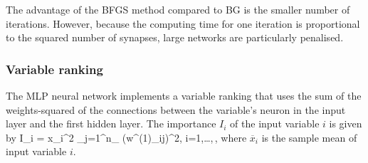 The advantage of the BFGS method compared to BG is the smaller number of
iterations. However, because the computing time for one iteration is
proportional to the squared number of synapses, large networks are
particularly penalised.

\subsubsection{Variable ranking}
\label{sec:ann:ranking}

The MLP neural network implements a variable ranking that uses the sum of the
weights-squared of the connections between the variable's neuron in the input
layer and the first hidden layer. The importance $I_i$ of the input variable
$i$ is given by
\beq
  \label{eq:mlp:ranking}
  I_i = \overline x_i^2 \sum_{j=1}^{n_} \left(w^{(1)}_{ij}\right)^2, \qquad i=1,\dots,\Nvar\,,
\eeq
where $\overline x_{i}$ is the sample mean of input variable $i$.

